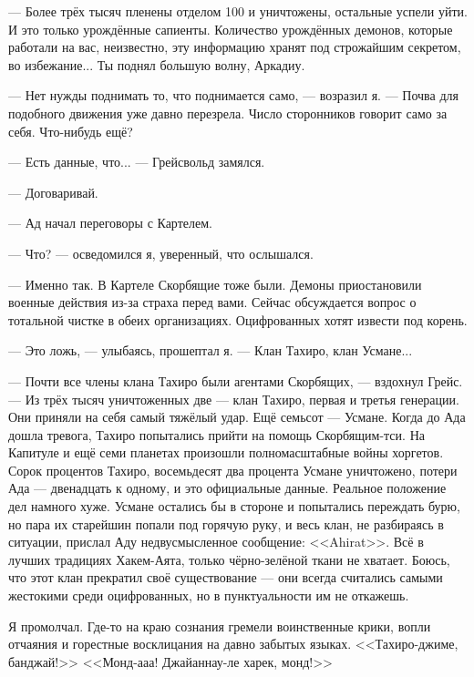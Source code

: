 --- Более трёх тысяч пленены отделом 100 и уничтожены, остальные успели уйти.
И это только урождённые сапиенты.
Количество урождённых демонов, которые работали на вас, неизвестно, эту информацию хранят под строжайшим секретом, во избежание...
Ты поднял большую волну, Аркадиу.

--- Нет нужды поднимать то, что поднимается само, --- возразил я.
--- Почва для подобного движения уже давно перезрела.
Число сторонников говорит само за себя.
Что-нибудь ещё?

--- Есть данные, что... --- Грейсвольд замялся.

--- Договаривай.

--- Ад начал переговоры с Картелем.

--- Что? --- осведомился я, уверенный, что ослышался.

--- Именно так.
В Картеле Скорбящие тоже были.
Демоны приостановили военные действия из-за страха перед вами.
Сейчас обсуждается вопрос о тотальной чистке в обеих организациях.
Оцифрованных хотят извести под корень.

--- Это ложь, --- улыбаясь, прошептал я.
--- Клан Тахиро, клан Усмане...

--- Почти все члены клана Тахиро были агентами Скорбящих, --- вздохнул Грейс.
--- Из трёх тысяч уничтоженных две --- клан Тахиро, первая и третья генерации.
Они приняли на себя самый тяжёлый удар.
Ещё семьсот --- Усмане.
Когда до Ада дошла тревога, Тахиро попытались прийти на помощь Скорбящим-тси.
На Капитуле и ещё семи планетах произошли полномасштабные войны хоргетов.
Сорок процентов Тахиро, восемьдесят два процента Усмане уничтожено, потери Ада --- двенадцать к одному, и это официальные данные.
Реальное положение дел намного хуже.
Усмане остались бы в стороне и попытались переждать бурю, но пара их старейшин попали под горячую руку, и весь клан, не разбираясь в ситуации, прислал Аду недвусмысленное сообщение: <<Ahirat>>\FM.
Всё в лучших традициях Хакем-Аята\FM, только чёрно-зелёной ткани не хватает.
Боюсь, что этот клан прекратил своё существование --- они всегда считались самыми жестокими среди оцифрованных, но в пунктуальности им не откажешь.

Я промолчал.
Где-то на краю сознания гремели воинственные крики, вопли отчаяния и горестные восклицания на давно забытых языках.
<<Тахиро-джиме, банджай!>>
<<Монд-ааа! Джайаннау-ле харек, монд!>>

